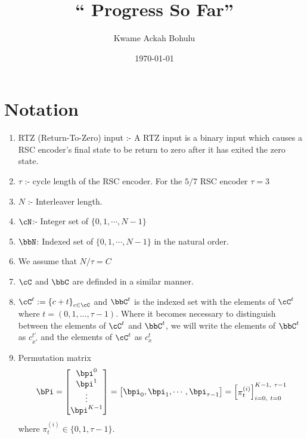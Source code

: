 \documentclass[11pt, oneside, dvipdfmx]{book}
\title{``
Progress So Far'' }
\author{Kwame Ackah Bohulu}
\date{\today}
\begin{document}
\maketitle
\section{Notation}
\begin{enumerate}
\item RTZ (Return-To-Zero) input :- A RTZ input is a binary input which causes a RSC encoder's final state to be return to zero after it has exited the zero state.

\item $\tau$ :- cycle length of the RSC encoder. For the $5/7$ RSC encoder $\tau = 3$

\item $N$ :- Interleaver length. 

\item $\cN$:- Integer set of $\{0,1,\cdots,N-1\}$

\item $\bbN$: Indexed set  of $\{0,1,\cdots,N-1\}$ in the natural order.

\item We assume that $N/\tau=C$

\item $\cC$ and $\bbC$ are definded in a similar manner.

\item $\cC^{t}:=\left\{c+t\right\}_{c \in \cC}$ and $\bbC^t$ is the indexed set with the elements of $\cC^t$ where  $t=(0,1,...,\tau-1)$. Where it becomes necessary to distinguish between the elements of $\cC^{t}$ and $\bbC^{t}$, we will write the elements of $\bbC^{t}$ as $c_{x'}^{t'}$ and the elements of $\cC^{t}$ as $c_x^{t}$

\item Permutation matrix 
\begin{equation*}
\bPi = \begin{bmatrix}
\bpi^0\cr
\bpi^1\cr
\vdots\cr
\bpi^{K-1}
\end{bmatrix}
= \begin{bmatrix}
\bpi_0 , \bpi_1,\cdots,\bpi_{\tau-1}
\end{bmatrix}
= \begin{bmatrix}
\pi_{t}^{(i)}
\end{bmatrix}_{i=0,~t=0}^{K-1,~\tau -1}
\end{equation*}
where $\pi_{t}^{(i)} \in \{0,1,\tau-1\}$. 


\end{enumerate}
\end{document}

